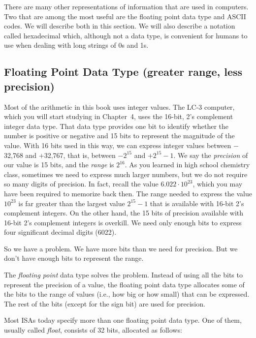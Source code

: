 \documentclass{patt}
\begin{document}
There are many other representations of information that are used in computers.
Two that are among the most useful are the floating point data type and ASCII
codes.  We will describe both in this section.  We will also
describe a notation called hexadecimal which, although not a data type,
is convenient for humans to use when dealing with long strings of 0s and 1s.

\subsection{Floating Point Data Type (greater range, less precision)}
\label{sec:fp_data_type}

Most of the arithmetic in this book uses integer values.
The LC-3 computer, which you will start studying in Chapter~4, uses the 
16-bit, 2's complement integer data type.  That data type provides one bit 
to identify whether the number is positive or negative and 15 bits to 
represent the magnitude of the value.  With 16 bits used 
in this way, we can express integer values between $-$32,768 and $+$32,767, 
that is, between $-2^{15}$ and $+2^{15}-1$.  We say the {\em precision} of
our value is 15 bits, and the {\em range} is $2^{16}$.  As you learned
in high school chemistry class, sometimes we need to express much
larger numbers, but we do not require so many digits of precision.  In
fact, recall the value \mbox{$6.022 {\cdot} 10^{23}$}, which you may have been
required to memorize back then. The range needed to express the value 
$10^{23}$ is far greater than the largest value $2^{15} -1$ that is available 
with 16-bit 2's complement integers.  On the other hand, the 15 bits of 
precision available with 16-bit 2's complement integers is overkill.  We need
only enough bits to express four significant decimal digits (6022).

So we have a problem.  We have more bits than we need for precision.
But we don't have enough bits to represent the range.

The {\em floating point} data type solves
the problem.  Instead of using all the bits 
to represent the precision of a value, the floating
point data type allocates some of the bits to the range of values
(i.e., how big or how small) that can be expressed. The rest of the bits
(except for the sign bit) are used for precision.

Most ISAs today specify more than one floating point data type.
One of them, usually called {\em float}, consists of 32 bits,
allocated as follows:
\end{document}

